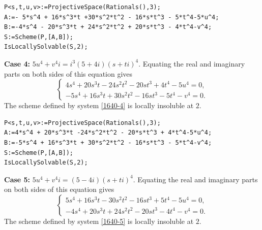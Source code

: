 \documentclass[a4paper,12pt,english,reqno]{amsart}
\begin{document}
\begin{lstlisting}
P<s,t,u,v>:=ProjectiveSpace(Rationals(),3);
A:=- 5*s^4 + 16*s^3*t +30*s^2*t^2 - 16*s*t^3 - 5*t^4-5*u^4;
B:=-4*s^4 - 20*s^3*t + 24*s^2*t^2 + 20*s*t^3 - 4*t^4-v^4;
S:=Scheme(P,[A,B]);
IsLocallySolvable(S,2);
\end{lstlisting}

{\bf Case 4:} $5u^4+v^4i=i^3(5+4i)(s+ti)^4$. Equating the real and imaginary parts on both sides of this equation gives
\begin{equation}\label{1640-4}
\begin{cases}
4s^4 + 20s^3t - 24s^2t^2 - 20st^3 + 4t^4 - 5u^4=0,\\
-5s^4 + 16s^3t + 30s^2t^2 - 16st^3 - 5t^4 - v^4=0.
\end{cases}
\end{equation}
The scheme defined by system \eqref{1640-4} is locally insoluble at $2$.


\begin{lstlisting}
P<s,t,u,v>:=ProjectiveSpace(Rationals(),3);
A:=4*s^4 + 20*s^3*t -24*s^2*t^2 - 20*s*t^3 + 4*t^4-5*u^4;
B:=-5*s^4 + 16*s^3*t + 30*s^2*t^2 - 16*s*t^3 - 5*t^4-v^4;
S:=Scheme(P,[A,B]);
IsLocallySolvable(S,2);
\end{lstlisting}
{\bf Case 5:} $5u^4+v^4i=(5-4i)(s+ti)^4$. Equating the real and imaginary parts on both sides of this equation gives
\begin{equation}\label{1640-5}
\begin{cases}
5s^4 + 16s^3t - 30s^2t^2 - 16st^3 + 5t^4 - 5u^4=0,\\
-4s^4 + 20s^3t + 24s^2t^2 - 20st^3 - 4t^4 - v^4=0.
\end{cases}
\end{equation}
The scheme defined by system \eqref{1640-5} is locally insoluble at $2$.

\end{document}
